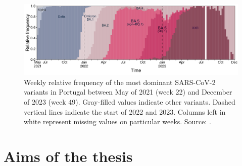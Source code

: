 \begin{figure}[h]
    \centering
    \includegraphics[width=\textwidth]{chapter/introduction/figures/fig1-sarscov2-genetic-diversity-pt03.pdf}
    \caption[Weekly relative frequency of most dominant SARS-CoV-2 variants in Portugal between May 2021 and December 2023]{Weekly relative frequency of the most dominant SARS-CoV-2 variants in Portugal between May of 2021 (week 22) and December of 2023 (week 49). Gray-filled values indicate other variants. Dashed vertical lines indicate the start of 2022 and 2023. Columns left in white represent missing values on particular weeks. Source: \citet{institutonacionaldesaudedoutorricardojorge2023GeneticDiversity}.}
    \label{fig:intro-sarscov2-genetic-diversity-pt}
\end{figure}





\section{Aims of the thesis}
\label{sec:aims-thesis}

